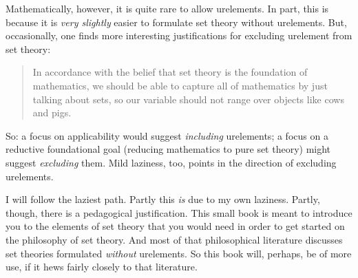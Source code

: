 \documentclass[../../../include/open-logic-section]{subfiles}
\begin{document}
Mathematically, however, it is quite rare to allow urelements. In part, this is because it is \emph{very slightly} easier to formulate set theory without urelements. %
But, occasionally, one finds more interesting justifications for excluding urelement from set theory:
\begin{quote}
	In accordance with the belief that set theory is the foundation of mathematics, we should be able to capture all of mathematics by just talking about sets, so our variable should not range over objects like cows and pigs. %
	\citep[8]{Kunen1980}
\end{quote}
So: a focus on applicability would suggest \emph{including} urelements; a focus on a reductive foundational goal (reducing mathematics to pure set theory) might suggest \emph{excluding} them. Mild laziness, too, points in the direction of excluding urelements. 

I will follow the laziest path. Partly this \emph{is} due to my own laziness. Partly, though, there is a pedagogical justification. This small book is meant to introduce you to the elements of set theory that you would need in order to get started on the philosophy of set theory. And most of that philosophical literature discusses set theories formulated \emph{without} urelements. So this book will, perhaps, be of more use, if it hews fairly closely to that literature. 
\end{document}
